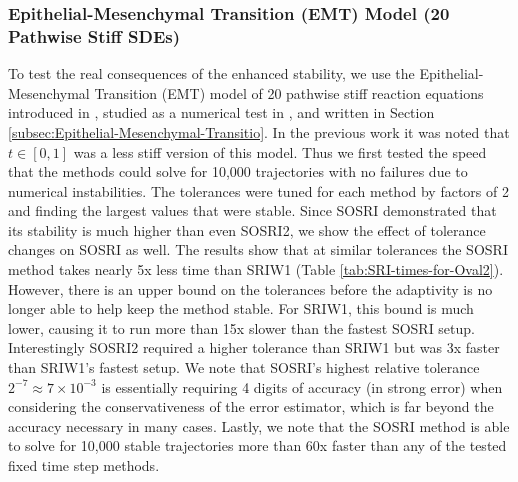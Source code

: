 \documentclass{article}
\begin{document}
\subsubsection{Epithelial-Mesenchymal Transition (EMT) Model (20 Pathwise Stiff
	SDEs) }

To test the real consequences of the enhanced stability, we use the
Epithelial-Mesenchymal Transition (EMT) model of 20 pathwise stiff
reaction equations introduced in \cite{RN3358}, studied as a numerical
test in \cite{RN3787}, and written in Section \ref{subsec:Epithelial-Mesenchymal-Transitio}.
In the previous work it was noted that $t\in\left[0,1\right]$ was
a less stiff version of this model. Thus we first tested the speed
that the methods could solve for 10,000 trajectories with no failures
due to numerical instabilities. The tolerances were tuned for each
method by factors of 2 and finding the largest values that were stable.
Since SOSRI demonstrated that its stability is much higher than even
SOSRI2, we show the effect of tolerance changes on SOSRI as well.
The results show that at similar tolerances the SOSRI method takes
nearly 5x less time than SRIW1 (Table \ref{tab:SRI-times-for-Oval2}).
However, there is an upper bound on the tolerances before the adaptivity
is no longer able to help keep the method stable. For SRIW1, this
bound is much lower, causing it to run more than 15x slower than the
fastest SOSRI setup. Interestingly SOSRI2 required a higher tolerance
than SRIW1 but was 3x faster than SRIW1's fastest setup. We note that
SOSRI's highest relative tolerance $2^{-7}\approx7\times10^{-3}$
is essentially requiring 4 digits of accuracy (in strong error) when
considering the conservativeness of the error estimator, which is
far beyond the accuracy necessary in many cases. Lastly, we note that
the SOSRI method is able to solve for 10,000 stable trajectories more
than 60x faster than any of the tested fixed time step methods.
\end{document}
